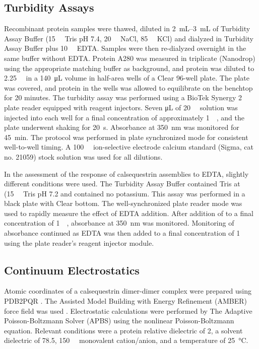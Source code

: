 \subsection*{Turbidity Assays}
Recombinant protein samples were thawed, diluted in \SIrange{2}{3}{\milli\liter} of Turbidity Assay Buffer (\SI{15}{\milli\Molar} Tris pH 7.4, \SI{20}{\milli\Molar} NaCl, \SI{85}{\milli\Molar} KCl) and dialyzed in Turbidity Assay Buffer plus \SI{10}{\milli\Molar} EDTA. Samples were then re-dialyzed overnight in the same buffer without EDTA. Protein A280 was measured in triplicate (Nanodrop) using the appropriate matching buffer as background, and protein was diluted to \SI{2.25}{\micro\Molar} in a \SI{140}{\micro\liter} volume in half-area wells of a \textmu Clear 96-well plate. The plate was covered, and protein in the wells was allowed to equilibrate on the benchtop for 20 minutes. The turbidity assay was performed using a BioTek Synergy 2 plate reader equipped with reagent injectors. Seven \si{\micro\liter} of \SI{20}{\milli\Molar}  solution was injected into each well for a final concentration of approximately \SI{1}{\milli\Molar}, and the plate underwent shaking for \SI{20}{\second}. Absorbance at \SI{350}{\nm} was monitored for \SI{45}{\minute}. The protocol was performed in plate synchronized mode for consistent well-to-well timing. A \SI{100}{\milli\Molar} ion-selective electrode calcium standard (Sigma, cat no. 21059) stock solution was used for all  dilutions.

In the assessment of the response of calsequestrin assemblies to EDTA, slightly different conditions were used. The Turbidity Assay Buffer contained Tris at (\SI{15}{\milli\Molar} Tris pH 7.2 and contained no potassium. This assay was performed in a black plate with \textmu Clear bottom. The well-synchronized plate reader mode was used to rapidly measure the effect of EDTA addition. After addition of  to a final concentration of \SI{1}{\milli\Molar}, absorbance at \SI{350}{\nm} was monitored. Monitoring of absorbance continued as EDTA was then added to a final concentration of \SI{1}{\milli\Molar} using the plate reader's reagent injector module.

\subsection*{Continuum Electrostatics}
Atomic coordinates of a calsequestrin dimer-dimer complex were prepared using PDB2PQR \supercite{Dolinsky2004-oa}. The Assisted Model Building with Energy Refinement (AMBER) force field was used \supercite{Cornell1995-ky}. Electrostatic calculations were performed by The Adaptive Poisson-Boltzmann Solver (APBS) \supercite{Jurrus2018-gc} using the nonlinear Poisson-Boltzmann equation. Relevant conditions were a protein relative dielectric of 2, a solvent dielectric of 78.5, \SI{150}{\milli\Molar} monovalent cation/anion, and a temperature of \SI{25}{\degreeCelsius}.

